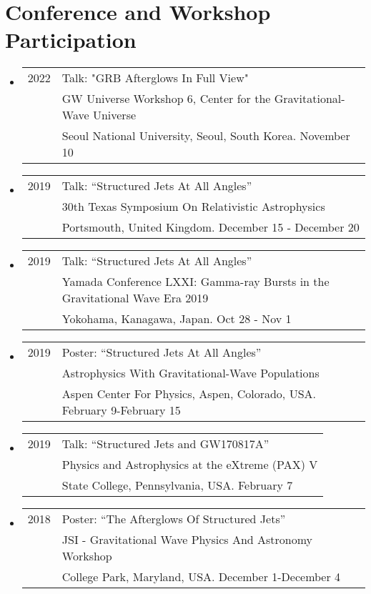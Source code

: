 \section*{Conference and Workshop Participation}
\begin{itemize}

\item \begin{tabular}{ll}
2022 & Talk: "GRB Afterglows In Full View"\\
	& GW Universe Workshop 6, Center for the Gravitational-Wave Universe  \\
	& Seoul National University, Seoul, South Korea.  November 10
\end{tabular}

\item \begin{tabular}{ll}
2019 & Talk: ``Structured Jets At All Angles'' \\
	 &  30th Texas Symposium On Relativistic Astrophysics \\
	 &  Portsmouth, United Kingdom. December 15 - December 20
\end{tabular}

\item \begin{tabular}{ll}
2019 & Talk: ``Structured Jets At All Angles'' \\
	 &  Yamada Conference LXXI: Gamma-ray Bursts in the Gravitational Wave Era 2019 \\
	 &  Yokohama, Kanagawa, Japan. Oct 28 - Nov 1
\end{tabular}

\item \begin{tabular}{ll}
2019 & Poster: ``Structured Jets At All Angles'' \\
	 &  Astrophysics With Gravitational-Wave Populations \\
	 &  Aspen Center For Physics, Aspen, Colorado, USA. February 9-February 15
\end{tabular}

\item \begin{tabular}{ll}
2019 & Talk: ``Structured Jets and GW170817A'' \\
	 & Physics and Astrophysics at the eXtreme (PAX) V \\
	 & State College, Pennsylvania, USA. February 7
\end{tabular}

\item \begin{tabular}{ll}
2018 & Poster: ``The Afterglows Of Structured Jets'' \\
	 & JSI - Gravitational Wave Physics And Astronomy Workshop \\
	 & College Park, Maryland, USA. December 1-December 4
\end{tabular}


\end{itemize}
